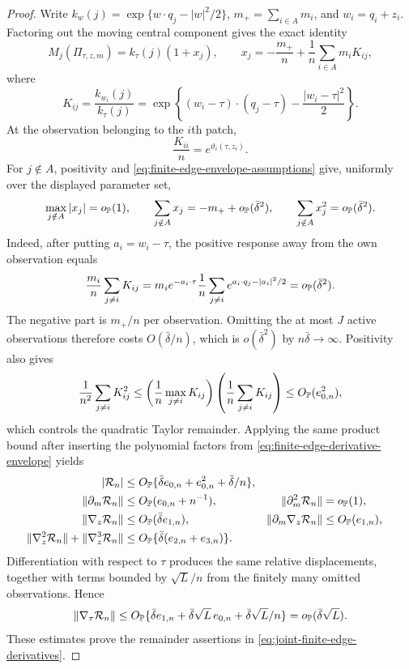 \begin{proof}
Write \(k_w(j)=\exp\{w\cdot q_j-|w|^2/2\}\), \(m_+=\sum_{i\in A}m_i\),
and \(w_i=q_i+z_i\).  Factoring out the moving central component gives
the exact identity
\[
 M_j(\Pi_{\tau,z,m})=k_\tau(j)(1+x_j),\qquad
 x_j=-\frac{m_+}{n}
 +\frac1n\sum_{i\in A}m_iK_{ij},
\]
where
\[
 K_{ij}
 =\frac{k_{w_i}(j)}{k_\tau(j)}
 =\exp\left\{(w_i-\tau)\cdot(q_j-\tau)
              -\frac{|w_i-\tau|^2}{2}\right\}.
\]
At the observation belonging to the \(i\)th patch,
\begin{equation}
\label{eq:finite-edge-own-response}
 \frac{K_{ii}}n=e^{\vartheta_i(\tau,z_i)}.
\end{equation}
For \(j\notin A\), positivity and
\eqref{eq:finite-edge-envelope-assumptions} give, uniformly over the
displayed parameter set,
\[
 \max_{j\notin A}|x_j|=o_{\mathbb P}(1),\qquad
 \sum_{j\notin A}x_j=-m_++o_{\mathbb P}(\bar\delta^2),
 \qquad
 \sum_{j\notin A}x_j^2=o_{\mathbb P}(\bar\delta^2).
\]
Indeed, after putting \(a_i=w_i-\tau\), the positive response away from
the own observation equals
\[
 \frac{m_i}{n}\sum_{j\ne i}K_{ij}
 =
 m_i e^{-a_i\cdot\tau}
 \frac1n\sum_{j\ne i}e^{a_i\cdot q_j-|a_i|^2/2}
 =o_{\mathbb P}(\bar\delta^2).
\]
The negative part is \(m_+/n\) per observation.  Omitting the at most
\(J\) active observations therefore costs \(O(\bar\delta/n)\), which is
\(o(\bar\delta^2)\) by \(n\bar\delta\to\infty\).  Positivity also gives
\[
 \frac1{n^2}\sum_{j\ne i}K_{ij}^2
 \le
 \left(\frac1n\max_{j\ne i}K_{ij}\right)
 \left(\frac1n\sum_{j\ne i}K_{ij}\right)
 \le O_{\mathbb P}(e_{0,n}^2),
\]
which controls the quadratic Taylor remainder. Applying the same product
bound after inserting the polynomial factors from
\eqref{eq:finite-edge-derivative-envelope} yields
\begin{align}
 |\mathcal R_n|
 &\le O_{\mathbb P}\{\bar\delta e_{0,n}+e_{0,n}^2
                   +\bar\delta/n\},\notag\\
 \|\partial_m\mathcal R_n\|
 &\le O_{\mathbb P}(e_{0,n}+n^{-1}),
 &\|\partial_m^2\mathcal R_n\|&=o_{\mathbb P}(1),\notag\\
 \|\nabla_z\mathcal R_n\|
 &\le O_{\mathbb P}(\bar\delta e_{1,n}),
 &\|\partial_m\nabla_z\mathcal R_n\|
   &\le O_{\mathbb P}(e_{1,n}),\notag\\
 \|\nabla_z^2\mathcal R_n\|+
 \|\nabla_z^3\mathcal R_n\|
 &\le O_{\mathbb P}\{\bar\delta(e_{2,n}+e_{3,n})\}.
 \label{eq:finite-edge-remainder-bounds}
\end{align}
Differentiation with respect to \(\tau\) produces the same relative
displacements, together with terms bounded by \(\sqrt L/n\) from the
finitely many omitted observations.  Hence
\begin{equation}
\label{eq:finite-edge-tau-remainder}
 \|\nabla_\tau\mathcal R_n\|
 \le O_{\mathbb P}\{\bar\delta e_{1,n}
                +\bar\delta\sqrt L\,e_{0,n}
                +\bar\delta\sqrt L/n\}
 =o_{\mathbb P}(\bar\delta\sqrt L).
\end{equation}
These estimates prove the remainder assertions in
\eqref{eq:joint-finite-edge-derivatives}.


\end{proof}
